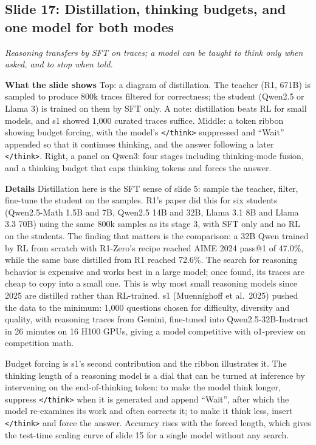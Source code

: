 \documentclass[11pt,letterpaper]{article}
\newcommand{\slide}[3]{%
  \subsection[Slide #1: #2]{Slide #1: #2}%
  {\color{muted}\itshape #3\par}\medskip}
\newcommand{\para}[1]{\medskip\noindent\textbf{#1}\quad}
\begin{document}
\slide{17}{Distillation, thinking budgets, and one model for both modes}{Reasoning transfers by SFT on traces; a model can be taught to think only when asked, and to stop when told.}

\para{What the slide shows} Top: a diagram of distillation. The teacher (R1, 671B) is sampled to produce 800k traces filtered for correctness; the student (Qwen2.5 or Llama 3) is trained on them by SFT only. A note: distillation beats RL for small models, and s1 showed 1,000 curated traces suffice. Middle: a token ribbon showing budget forcing, with the model's \texttt{</think>} suppressed and ``Wait'' appended so that it continues thinking, and the answer following a later \texttt{</think>}. Right, a panel on Qwen3: four stages including thinking-mode fusion, and a thinking budget that caps thinking tokens and forces the answer.

\para{Details} Distillation here is the SFT sense of slide 5: sample the teacher, filter, fine-tune the student on the samples. R1's paper did this for six students (Qwen2.5-Math 1.5B and 7B, Qwen2.5 14B and 32B, Llama 3.1 8B and Llama 3.3 70B) using the same 800k samples as its stage 3, with SFT only and no RL on the students. The finding that matters is the comparison: a 32B Qwen trained by RL from scratch with R1-Zero's recipe reached AIME 2024 pass@1 of 47.0\%, while the same base distilled from R1 reached 72.6\%. The search for reasoning behavior is expensive and works best in a large model; once found, its traces are cheap to copy into a small one. This is why most small reasoning models since 2025 are distilled rather than RL-trained. s1 (Muennighoff et al.\ 2025) pushed the data to the minimum: 1,000 questions chosen for difficulty, diversity and quality, with reasoning traces from Gemini, fine-tuned into Qwen2.5-32B-Instruct in 26 minutes on 16 H100 GPUs, giving a model competitive with o1-preview on competition math.

Budget forcing is s1's second contribution and the ribbon illustrates it. The thinking length of a reasoning model is a dial that can be turned at inference by intervening on the end-of-thinking token: to make the model think longer, suppress \texttt{</think>} when it is generated and append ``Wait'', after which the model re-examines its work and often corrects it; to make it think less, insert \texttt{</think>} and force the answer. Accuracy rises with the forced length, which gives the test-time scaling curve of slide 15 for a single model without any search.
\end{document}
